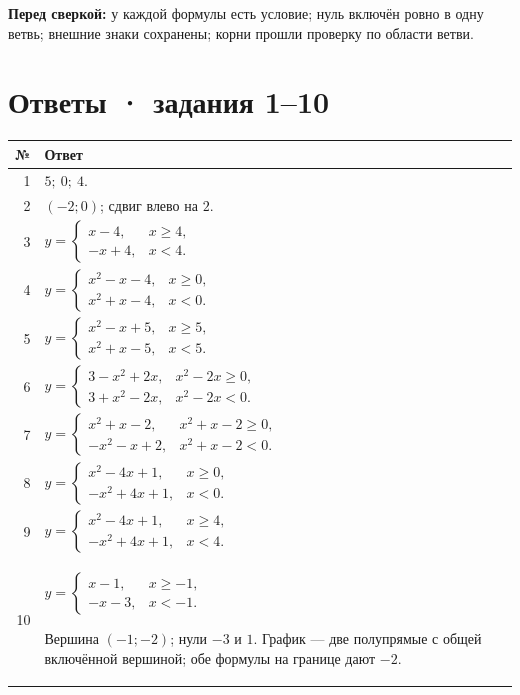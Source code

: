 \documentclass[a4paper,12pt]{article}
\newcommand{\topic}[1]{\section*{\color{darkaccent}#1}}
\newcommand{\key}[1]{\textbf{\color{darkaccent}#1}}
\begin{document}
\vfill
\key{Перед сверкой:} у каждой формулы есть условие; нуль включён ровно в одну ветвь; внешние знаки сохранены; корни прошли проверку по области ветви.
\clearpage
\topic{Ответы · задания 1--10}
\begin{longtable}{@{}r p{.92\linewidth}@{}}
\toprule
№ & Ответ \\
\midrule
\endhead
1 & $5;\ 0;\ 4$.\\[3mm]
2 & $(-2;0)$; сдвиг влево на $2$.\\[3mm]
3 & $\displaystyle y=\begin{cases}x-4,&x\ge4,\\-x+4,&x<4.\end{cases}$\\[7mm]
4 & $\displaystyle y=\begin{cases}x^2-x-4,&x\ge0,\\x^2+x-4,&x<0.\end{cases}$\\[7mm]
5 & $\displaystyle y=\begin{cases}x^2-x+5,&x\ge5,\\x^2+x-5,&x<5.\end{cases}$\\[8mm]
6 & $\displaystyle y=\begin{cases}3-x^2+2x,&x^2-2x\ge0,\\3+x^2-2x,&x^2-2x<0.\end{cases}$\\[7mm]
7 & $\displaystyle y=\begin{cases}x^2+x-2,&x^2+x-2\ge0,\\-x^2-x+2,&x^2+x-2<0.\end{cases}$\\[7mm]
8 & $\displaystyle y=\begin{cases}x^2-4x+1,&x\ge0,\\-x^2+4x+1,&x<0.\end{cases}$\\[7mm]
9 & $\displaystyle y=\begin{cases}x^2-4x+1,&x\ge4,\\-x^2+4x+1,&x<4.\end{cases}$\\[7mm]
10 & $\displaystyle y=\begin{cases}x-1,&x\ge-1,\\-x-3,&x<-1.\end{cases}$
\par Вершина $(-1;-2)$; нули $-3$ и $1$. График — две полупрямые с общей включённой вершиной; обе формулы на границе дают $-2$.\\[3mm]
\bottomrule
\end{longtable}
\end{document}
